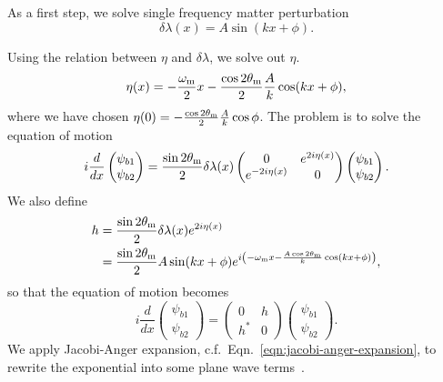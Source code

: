 As a first step, we solve single frequency matter perturbation
\begin{equation}
   \delta \lambda(x)  = A \sin (k x + \phi).
\end{equation}

Using the relation between $\eta$ and $\delta\lambda$, we solve out $\eta$.
\begin{equation}
   \eta(x) = - \frac{\omega_\mathrm m}{2}x - \frac{\cos 2\theta_\mathrm m}{2} \frac{A}{k} \cos (k x + \phi),
\end{equation}
where we have chosen $\eta(0)=-\frac{\cos 2\theta_\mathrm m}{2}\frac{A}{k}\cos\phi$.
The problem is to solve the equation of motion
\begin{equation}
   i \frac{d}{dx} \begin{pmatrix} \psi_{b1} \\ \psi_{b2} \end{pmatrix} = \frac{\sin 2\theta_\mathrm m}{2}\delta\lambda(x) \begin{pmatrix} 0 &  e^{2i\eta(x)} \\   e^{-2i\eta(x)} &  0 \end{pmatrix}  \begin{pmatrix} \psi_{b1} \\ \psi_{b2} \end{pmatrix} .
\end{equation}
We also define
\begin{align}
   h &= \frac{\sin 2\theta_\mm}{2}\delta\lambda(x)  e^{2i\eta(x)} \\
   & = \frac{\sin 2\theta_\mm}{2} A \sin (kx+\phi) e^{i\left( -\omega_\mm x - \frac{A \cos 2\theta_\mm}{k} \cos (kx+\phi) \right)},
   \label{chap:matter-sec:deep-jacobi-subsec:single-matter-freq-eqn:single-frequency-hamiltonian-element}
\end{align}
so that the equation of motion becomes
\begin{equation}
   i \frac{d}{dx} \begin{pmatrix} \psi_{b1} \\ \psi_{b2} \end{pmatrix} =  \begin{pmatrix} 0 &  h \\   h^* &  0 \end{pmatrix}  \begin{pmatrix} \psi_{b1} \\ \psi_{b2} \end{pmatrix} .
\end{equation}
We apply Jacobi-Anger expansion, c.f.~Eqn.~\ref{eqn:jacobi-anger-expansion}, to rewrite the exponential into some plane wave terms~\cite{Patton2014}.

